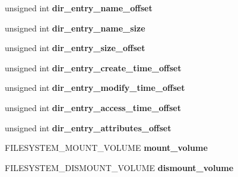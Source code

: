 \begin{DoxyCompactItemize}
\item 
\hypertarget{struct_f_i_l_e_s_y_s_t_e_m_a9b97d33895f2b2dc37a923cd449ae25d}{unsigned int {\bfseries dir\-\_\-entry\-\_\-name\-\_\-offset}}\label{struct_f_i_l_e_s_y_s_t_e_m_a9b97d33895f2b2dc37a923cd449ae25d}

\item 
\hypertarget{struct_f_i_l_e_s_y_s_t_e_m_a4caea83fb87a6fb6a55a194b52e29003}{unsigned int {\bfseries dir\-\_\-entry\-\_\-name\-\_\-size}}\label{struct_f_i_l_e_s_y_s_t_e_m_a4caea83fb87a6fb6a55a194b52e29003}

\item 
\hypertarget{struct_f_i_l_e_s_y_s_t_e_m_a5eb268b6508045e44c6124a2f06e3974}{unsigned int {\bfseries dir\-\_\-entry\-\_\-size\-\_\-offset}}\label{struct_f_i_l_e_s_y_s_t_e_m_a5eb268b6508045e44c6124a2f06e3974}

\item 
\hypertarget{struct_f_i_l_e_s_y_s_t_e_m_afd2e333d17e5904b36ac0a43f1c72d82}{unsigned int {\bfseries dir\-\_\-entry\-\_\-create\-\_\-time\-\_\-offset}}\label{struct_f_i_l_e_s_y_s_t_e_m_afd2e333d17e5904b36ac0a43f1c72d82}

\item 
\hypertarget{struct_f_i_l_e_s_y_s_t_e_m_a35394859917f7dc7c9c9b2bbd9fb06d4}{unsigned int {\bfseries dir\-\_\-entry\-\_\-modify\-\_\-time\-\_\-offset}}\label{struct_f_i_l_e_s_y_s_t_e_m_a35394859917f7dc7c9c9b2bbd9fb06d4}

\item 
\hypertarget{struct_f_i_l_e_s_y_s_t_e_m_ab1163aa8bec90d2c086f7a61bbb3a237}{unsigned int {\bfseries dir\-\_\-entry\-\_\-access\-\_\-time\-\_\-offset}}\label{struct_f_i_l_e_s_y_s_t_e_m_ab1163aa8bec90d2c086f7a61bbb3a237}

\item 
\hypertarget{struct_f_i_l_e_s_y_s_t_e_m_ae20cf6832bee2f385e5a2bcdddd24a71}{unsigned int {\bfseries dir\-\_\-entry\-\_\-attributes\-\_\-offset}}\label{struct_f_i_l_e_s_y_s_t_e_m_ae20cf6832bee2f385e5a2bcdddd24a71}

\item 
\hypertarget{struct_f_i_l_e_s_y_s_t_e_m_a98af0dbd96d78d080985befb2b2ac89b}{F\-I\-L\-E\-S\-Y\-S\-T\-E\-M\-\_\-\-M\-O\-U\-N\-T\-\_\-\-V\-O\-L\-U\-M\-E {\bfseries mount\-\_\-volume}}\label{struct_f_i_l_e_s_y_s_t_e_m_a98af0dbd96d78d080985befb2b2ac89b}

\item 
\hypertarget{struct_f_i_l_e_s_y_s_t_e_m_a64662f4aaaeeaee17707760cf26af3ee}{F\-I\-L\-E\-S\-Y\-S\-T\-E\-M\-\_\-\-D\-I\-S\-M\-O\-U\-N\-T\-\_\-\-V\-O\-L\-U\-M\-E {\bfseries dismount\-\_\-volume}}\label{struct_f_i_l_e_s_y_s_t_e_m_a64662f4aaaeeaee17707760cf26af3ee}


\end{DoxyCompactItemize}
